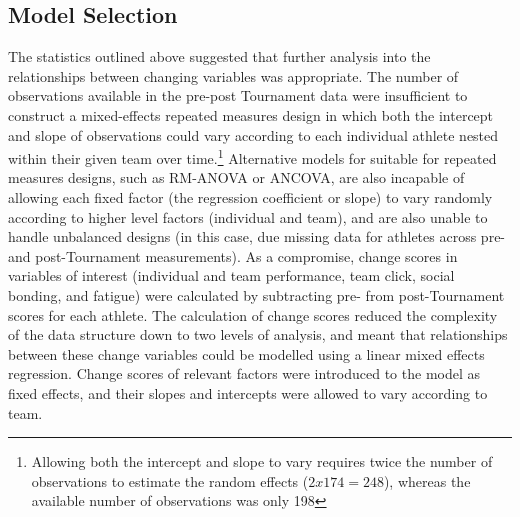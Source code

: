 \clearpage


\begin{landscape}






\end{landscape}
\restoregeometry



\subsection{Model Selection}
The statistics outlined above suggested that further analysis into the relationships between changing variables was appropriate. The number of observations available in the pre-post Tournament data were insufficient to construct a mixed-effects repeated measures design in which both the intercept and slope of observations could vary according to each individual athlete nested within their given team over time.\footnote{Allowing both the intercept and slope to vary requires twice the number of observations to estimate the random effects ($2x174 = 248$), whereas the available number of observations was only 198} Alternative models for suitable for repeated measures designs, such as RM-ANOVA or ANCOVA, are also incapable of allowing each fixed factor (the regression coefficient or slope) to vary randomly according to higher level factors (individual and team), and are also unable to handle unbalanced designs (in this case, due missing data for athletes across pre- and post-Tournament measurements). As a compromise, change scores in variables of interest (individual and team performance, team click, social bonding, and fatigue) were calculated by subtracting pre- from post-Tournament scores for each athlete. The calculation of change scores reduced the complexity of the data structure down to two levels of analysis, and meant that relationships between these change variables could be modelled using a linear mixed effects regression. Change scores of relevant factors were introduced to the model as fixed effects, and their slopes and intercepts were allowed to vary according to team.


